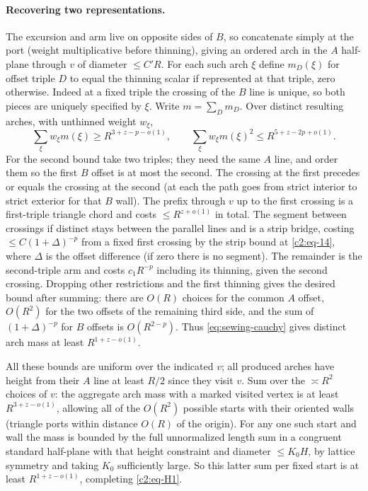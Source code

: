\paragraph{Recovering two representations.}
The excursion and arm live on opposite sides of \(B\), so concatenate simply at the port (weight multiplicative before thinning), giving an ordered arch in the \(A\) half-plane through \(v\) of diameter \(\le C'R\). For each such arch \(\xi\) define \(m_D(\xi)\) for offset triple \(D\) to equal the thinning scalar if represented at that triple, zero otherwise. Indeed at a fixed triple the crossing of the \(B\) line is unique, so both pieces are uniquely specified by \(\xi\). Write \(m=\sum_D m_D\). Over distinct resulting arches, with unthinned weight \(w_\xi\),
\begin{equation}
 \sum_\xi w_\xi m(\xi)\ge R^{3+z-p-o(1)},\qquad
 \sum_\xi w_\xi m(\xi)^2\le R^{5+z-2p+o(1)}.                             \label{c2:eq-H2}
\end{equation}
For the second bound take two triples; they need the same \(A\) line, and order them so the first \(B\) offset is at most the second. The crossing at the first precedes or equals the crossing at the second (at each the path goes from strict interior to strict exterior for that \(B\) wall). The prefix through \(v\) up to the first crossing is a first-triple triangle chord and costs \(\le R^{z+o(1)}\) in total. The segment between crossings if distinct stays between the parallel lines and is a strip bridge, costing \(\le C(1+\Delta)^{-p}\) from a fixed first crossing by the strip bound at \eqref{c2:eq-14}, where \(\Delta\) is the offset difference (if zero there is no segment). The remainder is the second-triple arm and costs \(c_1 R^{-p}\) including its thinning, given the second crossing. Dropping other restrictions and the first thinning gives the desired bound after summing: there are \(O(R)\) choices for the common \(A\) offset, \(O(R^2)\) for the two offsets of the remaining third side, and the sum of \((1+\Delta)^{-p}\) for \(B\) offsets is \(O(R^{2-p})\). Thus \eqref{eq:sewing-cauchy} gives distinct arch mass at least \(R^{1+z-o(1)}\).

All these bounds are uniform over the indicated \(v\); all produced arches have height from their \(A\) line at least \(R/2\) since they visit \(v\). Sum over the \(\asymp R^2\) choices of \(v\): the aggregate arch mass with a marked visited vertex is at least \(R^{3+z-o(1)}\), allowing all of the \(O(R^2)\) possible starts with their oriented walls (triangle ports within distance \(O(R)\) of the origin). For any one such start and wall the mass is bounded by the full unnormalized length sum in a congruent standard half-plane with that height constraint and diameter \(\le K_0H\), by lattice symmetry and taking \(K_0\) sufficiently large. So this latter sum per fixed start is at least \(R^{1+z-o(1)}\), completing \eqref{c2:eq-H1}.

